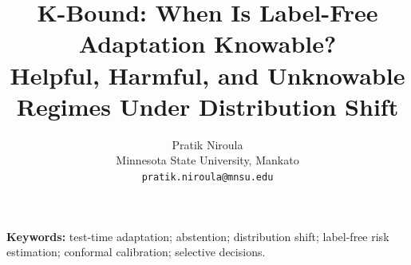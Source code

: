 \documentclass[11pt,twocolumn]{article}
\title{\vspace{-1.5em}\textbf{K-Bound: When Is Label-Free Adaptation Knowable?}\\[-1pt]
\large Helpful, Harmful, and Unknowable Regimes Under Distribution Shift}
\author{Pratik Niroula\\
\small Minnesota State University, Mankato\\
\small \texttt{pratik.niroula@mnsu.edu}}
\date{}
\theoremstyle{plain}
\theoremstyle{definition}
\theoremstyle{remark}
\begin{document}
\maketitle
\begin{abstract}\end{abstract}
\noindent\textbf{Keywords:} test-time adaptation; abstention; distribution shift;
label-free risk estimation; conformal calibration; selective decisions.

{\footnotesize}
\end{document}
